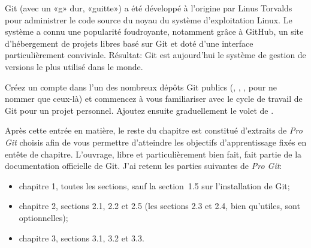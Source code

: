Git (avec un «g» dur, «guitte») a été développé à l'origine
par Linus Torvalds pour administrer le code source du noyau du système
d'exploitation Linux. Le système a connu une popularité foudroyante,
notamment grâce à GitHub, un site d'hébergement de projets libres basé
sur Git et doté d'une interface particulièrement conviviale. Résultat:
Git est aujourd'hui le système de gestion de versions le plus utilisé
dans le monde.

Créez un compte dans l'un des nombreux dépôts Git publics
(, ,
, pour ne nommer que ceux-là) et
commencez à vous familiariser avec le cycle de travail de Git pour un
projet personnel. Ajoutez ensuite graduellement le volet de %
. %

Après cette entrée en matière, le reste du chapitre est constitué
d'extraits de \emph{Pro Git} \citep{ProGit:2e:2014} choisis afin de
vous permettre d'atteindre les objectifs d'apprentissage fixés en
entête de chapitre. L'ouvrage, libre et particulièrement bien fait,
fait partie de la documentation officielle de Git. J'ai retenu les
parties suivantes de \emph{Pro Git}:
\begin{itemize}
\item chapitre 1, toutes les sections, sauf la section~1.5 sur
  l'installation de Git;
\item chapitre 2, sections 2.1, 2.2 et 2.5 (les sections 2.3 et 2.4,
  bien qu'utiles, sont optionnelles);
\item chapitre 3, sections 3.1, 3.2 et 3.3.
\end{itemize}

